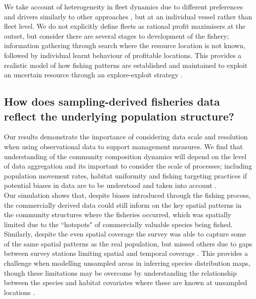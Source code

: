 \documentclass[review]{elsarticle}
\begin{document}
We take account of heterogeneity in fleet dynamics due to different preferences
and drivers similarly to other approaches \citep{Fulton2011}, but at an
individual vessel rather than fleet level. We do not explicitly define fleets
as rational profit maximisers at the outset, but consider there are several
stages to development of the fishery; information gathering through search
where the resource location is not known, followed by individual learnt
behaviour of profitable locations.  This provides a realistic model of how
fishing patterns are established and maintained to exploit an uncertain
resource through an explore-exploit strategy \citep{Mangel1983, Bailey2018}. 

\subsection{How does sampling-derived fisheries data reflect the underlying
	population structure?}


Our results demonstrate the importance of considering data scale and resolution
when using observational data to support management measures. We find that
understanding of the community composition dynamics will depend on the level of
data aggregation and its important to consider the scale of processes;
including population movement rates, habitat uniformity and fishing targeting
practices if potential biases in data are to be understood and taken into
account . \\

Our simulation shows that, despite biases introduced through the fishing
process, the commercially derived data could still inform on the key spatial
patterns in the community structures where the fisheries occurred, which was
spatially limited due to the ``hotspots" of commercially valuable species being
fished. Similarly, despite the even spatial coverage the survey was able to
capture some of the same spatial patterns as the real population, but missed
others due to gaps between survey stations limiting spatial and temporal
coverage . This provides a challenge when
modelling unsampled areas in inferring species distribution maps, though these
limitations may be overcome by understanding the relationship between the
species and habitat covariates where these are known at unsampled locations
\citep{Robinson2011}. \\ 
\end{document}
